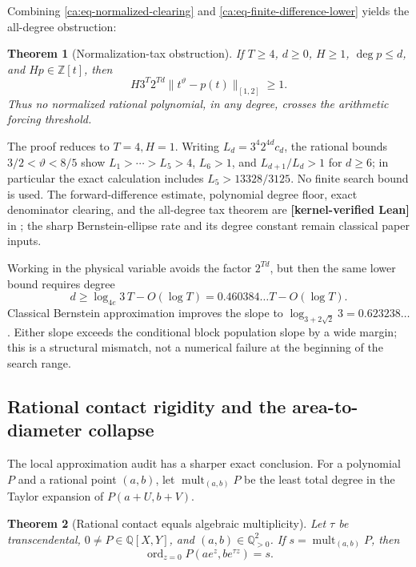 \documentclass[11pt,oneside]{article}
\newtheorem{theorem}{Theorem}[section]
\theoremstyle{definition}
\theoremstyle{remark}
\newcommand{\Z}{\mathbb Z}
\newcommand{\Q}{\mathbb Q}
\newcommand{\thetaq}{\vartheta}
\newcommand{\lean}[1]{\texttt{\detokenize{#1}}}
\newcommand{\statuslean}{\textcolor{leanblue}{\textbf{[kernel-verified Lean]}}}
\begin{document}
Combining \eqref{ca:eq-normalized-clearing} and
\eqref{ca:eq-finite-difference-lower} yields the all-degree obstruction:
\begin{theorem}[Normalization-tax obstruction]
\label{ca:thm-normalization-tax}
If $T\ge4$, $d\ge0$, $H\ge1$, $\deg p\le d$, and $Hp\in\Z[t]$, then
\begin{equation}
 H3^T2^{Td}\|t^{\thetaq}-p(t)\|_{[1,2]}\ge1.
 \label{ca:eq-normalization-tax}
\end{equation}
Thus no normalized rational polynomial, in any degree, crosses the arithmetic forcing
threshold.
\end{theorem}

The proof reduces to $T=4,H=1$.  Writing $L_d=3^4 2^{4d}c_d$, the rational bounds
$3/2<\thetaq<8/5$ show $L_1>\cdots>L_5>4$, $L_6>1$, and
$L_{d+1}/L_d>1$ for $d\ge6$; in particular the exact calculation includes
$L_5>13328/3125$.  No finite search bound is used.  The forward-difference estimate,
polynomial degree floor, exact denominator clearing, and the all-degree tax theorem are
\statuslean{} in \lean{PolynomialApproximationTax}; the sharp Bernstein-ellipse rate and its
degree constant remain classical paper inputs.

Working in the physical variable avoids the factor $2^{Td}$, but then the same lower bound
requires degree
\[
 d\ge\log_{4e}3\,T-O(\log T)
 =0.460384\ldots T-O(\log T).
\]
Classical Bernstein approximation improves the slope to
$\log_{3+2\sqrt2}3=0.623238\ldots$.  Either slope exceeds the conditional block
population slope by a wide margin; this is a structural mismatch, not a numerical failure at
the beginning of the search range.

\subsection{Rational contact rigidity and the area-to-diameter collapse}
\label{ca:contact}

The local approximation audit has a sharper exact conclusion.  For a polynomial $P$ and a
rational point $(a,b)$, let $\operatorname{mult}_{(a,b)}P$ be the least total degree in the
Taylor expansion of $P(a+U,b+V)$.

\begin{theorem}[Rational contact equals algebraic multiplicity]
\label{ca:thm-contact-multiplicity}
Let $\tau$ be transcendental, $0\ne P\in\Q[X,Y]$, and
$(a,b)\in\Q_{>0}^2$.  If $s=\operatorname{mult}_{(a,b)}P$, then
\begin{equation}
 \operatorname{ord}_{z=0}P(ae^z,be^{\tau z})=s.
 \label{ca:eq-contact-multiplicity}
\end{equation}
\end{theorem}
\end{document}
